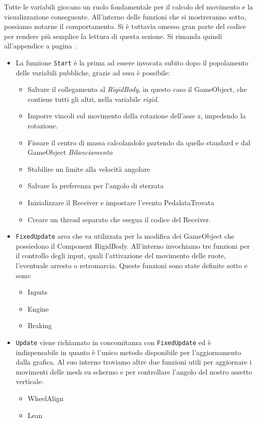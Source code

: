\noindent Tutte le variabili giocano un ruolo fondamentale per il calcolo del movimento e la visualizzazione conseguente. All’interno delle funzioni che si mostreranno sotto, possiamo notarne il comportamento. Si è tuttavia omesso gran parte del codice per rendere più semplice la lettura di questa sezione. Si rimanda quindi all'appendice  a pagina \pageref{controller}.
\begin{itemize}
	
	\item La funzione \texttt{Start} è la prima ad essere invocata subito dopo il popolamento delle variabili pubbliche, grazie ad essa è possibile:
  	\begin{itemize}
  		\item Salvare il collegamento al \textit{RigidBody}, in questo caso il GameObject, che contiene tutti gli altri, nella variabile \textit{rigid}.
  		\item Imporre vincoli sul movimento della rotazione dell’asse z, impedendo la rotazione.
  		\item Fissare il centro di massa calcolandolo partendo da quello standard e dal GameObject \textit{Bilanciamento}
  		\item Stabilire un limite alla velocità angolare
  		\item Salvare la preferenza per l’angolo di sterzata
  		\item Inizializzare il Receiver e impostare l'evento PedalataTrovata
  		\item Creare un thread separato che esegua il codice del Receiver.
	\end{itemize}
	
	\item \texttt{FixedUpdate} area che va utilizzata per la modifica dei GameObject che possiedono il Component RigidBody. All’interno invochiamo tre funzioni per il controllo degli input, quali l’attivazione del movimento delle ruote, l’eventuale arresto o retromarcia. Queste funzioni sono state definite sotto e sono:
		\begin{itemize}
			\item Inputs
			\item Engine
			\item Braking
		\end{itemize}
		
	\item \texttt{Update} viene richiamato in concomitanza con \texttt{Fixed\-Update} ed è indispensabile in quanto è l’unico metodo disponibile per l’aggiornamento dalla grafica. Al suo interno troviamo altre due funzioni utili per aggiornare i movimenti delle mesh su schermo e per controllare l’angolo del nostro assetto verticale:		\begin{itemize}
			\item WheelAlign
			\item Lean
		\end{itemize}
	

\end{itemize}
